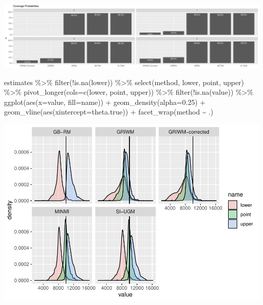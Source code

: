 \documentclass[
]{article}
\newenvironment{Shaded}{\begin{snugshade}}{\end{snugshade}}
\newcommand{\AttributeTok}[1]{\textcolor[rgb]{0.77,0.63,0.00}{#1}}
\newcommand{\FloatTok}[1]{\textcolor[rgb]{0.00,0.00,0.81}{#1}}
\newcommand{\FunctionTok}[1]{\textcolor[rgb]{0.00,0.00,0.00}{#1}}
\newcommand{\NormalTok}[1]{#1}
\newcommand{\SpecialCharTok}[1]{\textcolor[rgb]{0.00,0.00,0.00}{#1}}
\begin{document}
\includegraphics{sim_exp-results_files/figure-latex/unnamed-chunk-7-1.pdf}

\begin{Shaded}
\begin{Highlighting}[]
\NormalTok{estimates }\SpecialCharTok{\%\textgreater{}\%}
  \FunctionTok{filter}\NormalTok{(}\SpecialCharTok{!}\FunctionTok{is.na}\NormalTok{(lower)) }\SpecialCharTok{\%\textgreater{}\%}
  \FunctionTok{select}\NormalTok{(method, lower, point, upper) }\SpecialCharTok{\%\textgreater{}\%}
  \FunctionTok{pivot\_longer}\NormalTok{(}\AttributeTok{cols=}\FunctionTok{c}\NormalTok{(lower, point, upper)) }\SpecialCharTok{\%\textgreater{}\%}
  \FunctionTok{filter}\NormalTok{(}\SpecialCharTok{!}\FunctionTok{is.na}\NormalTok{(value)) }\SpecialCharTok{\%\textgreater{}\%}
  \FunctionTok{ggplot}\NormalTok{(}\FunctionTok{aes}\NormalTok{(}\AttributeTok{x=}\NormalTok{value, }\AttributeTok{fill=}\NormalTok{name)) }\SpecialCharTok{+}
  \FunctionTok{geom\_density}\NormalTok{(}\AttributeTok{alpha=}\FloatTok{0.25}\NormalTok{) }\SpecialCharTok{+}
  \FunctionTok{geom\_vline}\NormalTok{(}\FunctionTok{aes}\NormalTok{(}\AttributeTok{xintercept=}\NormalTok{theta.true)) }\SpecialCharTok{+}
  \FunctionTok{facet\_wrap}\NormalTok{(method }\SpecialCharTok{\textasciitilde{}}\NormalTok{ .)}
\end{Highlighting}
\end{Shaded}

\includegraphics{sim_exp-results_files/figure-latex/unnamed-chunk-8-1.pdf}
\end{document}
